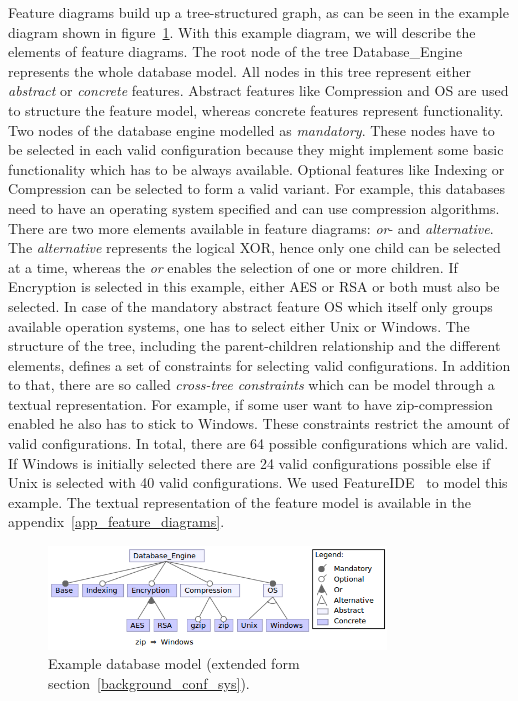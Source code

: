 Feature diagrams build up a tree-structured graph, as can be seen in the example diagram shown in figure~\ref{background_variab_models_feature_diagram_example}. 
With this example diagram, we will describe the elements of feature diagrams. 
The root node of the tree \textsf{Database\_Engine} represents the whole database model. 
All nodes in this tree represent either \textit{abstract} or \textit{concrete} features. 
Abstract features like \textsf{Compression} and \textsf{OS} are used to structure the feature model, whereas concrete features represent functionality. 
Two nodes of the database engine modelled as \textit{mandatory}. 
These nodes have to be selected in each valid configuration because they might implement some basic functionality which has to be always available. 
Optional features like \textsf{Indexing} or \textsf{Compression} can be selected to form a valid variant. 
For example, this databases need to have an operating system specified and can use compression algorithms. 
There are two more elements available in feature diagrams: \textit{or}- and \textit{alternative}. 
The \textit{alternative} represents the logical XOR, hence only one child can be selected at a time, whereas the \textit{or} enables the selection of one or more children. 
If \textsf{Encryption} is selected in this example, either \textsf{AES} or \textsf{RSA} or both must also be selected. 
In case of the mandatory abstract feature \textsf{OS} which itself only groups available operation systems, one has to select either \textsf{Unix} or \textsf{Windows}. 
The structure of the tree, including the parent-children relationship and the different elements, defines a set of constraints for selecting valid configurations. 
In addition to that, there are so called \textit{cross-tree constraints} which can be model through a textual representation. 
For example, if some user want to have zip-compression enabled he also has to stick to Windows. 
These constraints restrict the amount of valid configurations. 
In total, there are 64 possible configurations which are valid. 
If \textsf{Windows} is initially selected there are 24 valid configurations possible else if \textsf{Unix} is selected with 40 valid configurations.
We used FeatureIDE~\cite{kastner2009featureide} to model this example. 
The textual representation of the feature model is available in the appendix~\ref{app_feature_diagrams}.

\begin{figure}
  \centering
  \includegraphics[width=0.8\textwidth]{images/example_database}
  \caption{Example database model (extended form section~\ref{background_conf_sys}).}
  \label{background_variab_models_feature_diagram_example}
\end{figure}

